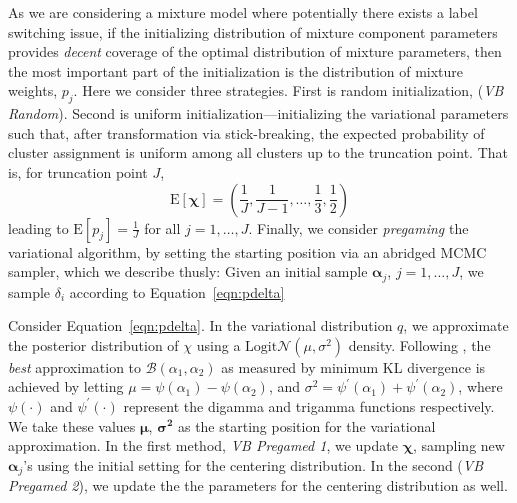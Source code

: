 
As we are considering a mixture model where potentially there exists a label switching
    issue, if the initializing distribution of mixture component parameters provides
    \emph{decent} coverage of the optimal distribution of mixture parameters, then the most 
    important part of the initialization is the distribution of mixture weights, $p_j$.  
    Here we consider three strategies.  First is random initialization,
    (\emph{VB Random}).  Second is uniform initialization---initializing the variational 
    parameters such that, after transformation via stick-breaking, the expected probability 
    of cluster assignment is uniform among all clusters up to the truncation point. That 
    is, for truncation point $J$,
    \[
        \text{E}[\bm{\chi}] = \left(\frac{1}{J},\frac{1}{J-1},\ldots,\frac{1}{3},\frac{1}{2}\right)
    \]
    leading to $\text{E}[p_j] = \frac{1}{J}$ for all $j = 1,\ldots,J$.
    Finally, we consider \emph{pregaming} the variational algorithm, by setting the starting 
    position via an abridged MCMC sampler, which we describe thusly:
    Given an initial sample $\bm{\alpha}_j$, $j = 1,\ldots,J$, we sample $\delta_i$ according
    to Equation~\eqref{eqn:pdelta}


    
    Consider Equation~\eqref{eqn:pdelta}. In the variational distribution $q$, we approximate the 
    posterior distribution of $\chi$ using a $\text{Logit}\mathcal{N}(\mu,\sigma^2)$ density.  
    Following \cite{aitchison1980}, the \emph{best} approximation to 
    $\mathcal{B}(\alpha_1,\alpha_2)$ as measured by minimum KL divergence is achieved by 
    letting $\mu = \psi(\alpha_1) - \psi(\alpha_2)$, and 
    $\sigma^2 = \psi^{\prime}(\alpha_1) + \psi^{\prime}(\alpha_2)$, where 
    $\psi(\cdot)$ and $\psi^{\prime}(\cdot)$ represent the digamma and trigamma functions 
    respectively.  We take these values $\bm{\mu}$, $\bm{\sigma^2}$ as the starting position for
    the variational approximation. In the first method, \emph{VB Pregamed 1}, 
    we update $\bm{\chi}$, sampling new $\bm{\alpha}_j$'s using the initial setting
    for the centering distribution.  In the second (\emph{VB Pregamed 2}), we update the
    the parameters for the centering distribution as well. 

